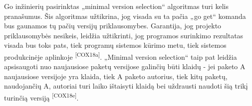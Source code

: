 Go inžinierių pasirinktas „minimal version selection“ algoritmas turi kelis pranašumus.
Šis algoritmas užtikrina, jog visada su ta pačia „go get“ komanda bus gaunamos tų pačių versijų priklausomybes.
Garantija, jog projekto priklausomybės nesikeis, leidžia užtikrinti, jog programos surinkimo rezultatas visada bus toks pats,
tiek programų sistemos kūrimo metu, tiek sistemos produkcinėje aplinkoje \textsuperscript{[COX18a]}. „Minimal version selection“ taip pat
leidžia apsisaugoti nuo naujausiose paketų versijose galinčių būti klaidų - jei paketo A naujausiose versijoje yra klaida,
tiek A paketo autorius, tiek kitų paketų, naudojančių A, autoriai turi laiko ištaisyti klaidą bei
uždrausti naudoti šią trikį turinčią versiją \textsuperscript{[COX18e]}.

